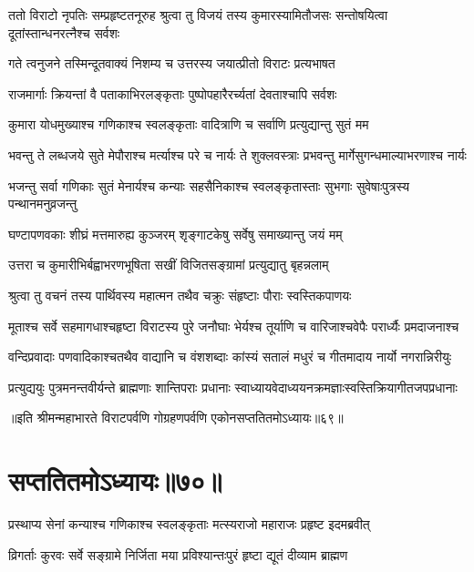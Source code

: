 
\threelineshloka
{ततो विराटो नृपतिः सम्प्रहृष्टतनूरुह}
{श्रुत्वा तु विजयं तस्य कुमारस्यामितौजसः}
{सन्तोषयित्वा दूतांस्तान्धनरत्नैश्च सर्वशः}


\twolineshloka
{गते त्वनुजने तस्मिन्दूतवाक्यं निशम्य च}
{उत्तरस्य जयात्प्रीतो विराटः प्रत्यभाषत}


\twolineshloka
{राजमार्गाः क्रियन्तां वै पताकाभिरलङ्कृताः}
{पुष्पोपहारैरर्च्यतां देवताश्चापि सर्वशः}


\twolineshloka
{कुमारा योधमुख्याश्च गणिकाश्च स्वलङ्कृताः}
{वादित्राणि च सर्वाणि प्रत्युद्यान्तु सुतं मम}


\twolineshloka
{भवन्तु ते लब्धजये सुते मेपौराश्च मर्त्याश्च परे च नार्यः}
{ते शुक्लवस्त्राः प्रभवन्तु मार्गेसुगन्धमाल्याभरणाश्च नार्यः}


\twolineshloka
{भजन्तु सर्वा गणिकाः सुतं मेनार्यश्च कन्याः सहसैनिकाश्च}
{स्वलङ्कृतास्ताः सुभगाः सुवेषाःपुत्रस्य पन्थानमनुव्रजन्तु}


\twolineshloka
{घण्टापणवकाः शीघ्रं मत्तमारुह्य कुञ्जरम्}
{शृङ्गाटकेषु सर्वेषु समाख्यान्तु जयं मम्}


\twolineshloka
{उत्तरा च कुमारीभिर्बह्वाभरणभूषिता}
{सखीं विजितसङ्ग्रामां प्रत्युद्यातु बृहन्नलाम्}


\twolineshloka
{श्रुत्वा तु वचनं तस्य पार्थिवस्य महात्मन}
{तथैव चक्रुः संहृष्टाः पौराः स्वस्तिकपाणयः}


\twolineshloka
{मूताश्च सर्वे सहमागधाश्चहृष्टा विराटस्य पुरे जनौघाः}
{भेर्यश्च तूर्याणि च वारिजाश्चवेपैः परार्ध्यैः प्रमदाजनाश्च}


\twolineshloka
{वन्दिप्रवादाः पणवादिकाश्चतथैव वाद्यानि च वंशशब्दाः}
{कांस्यं सतालं मधुरं च गीतमादाय नार्यो नगरान्निरीयुः}


\twolineshloka
{प्रत्युद्ययुः पुत्रमनन्तवीर्यन्ते ब्राह्मणाः शान्तिपराः प्रधानाः}
{स्वाध्यायवेदाध्ययनक्रमज्ञाःस्वस्तिक्रियागीतजपप्रधानाः}

॥इति श्रीमन्महाभारते विराटपर्वणि गोग्रहणपर्वणि एकोनसप्ततितमोऽध्यायः॥६९॥

\chapter{सप्ततितमोऽध्यायः॥७०॥}

\twolineshloka
{प्रस्थाप्य सेनां कन्याश्च गणिकाश्च स्वलङ्कृताः}
{मत्स्यराजो महाराजः प्रहृष्ट इदमब्रवीत्}


\twolineshloka
{व्रिगर्ताः कुरवः सर्वे सङ्ग्रामे निर्जिता मया}
{प्रविश्यान्तःपुरं हृष्टा द्यूतं दीव्याम ब्राह्मण}


